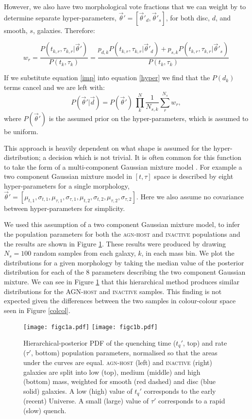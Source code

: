 \documentclass[useAMS,usenatbib]{mn2e}
\begin{document}
{However, we also have two morphological vote fractions that we can weight by to determine separate hyper-parameters, $\vec{\theta}' = [\vec{\theta}'_d, \vec{\theta}'_s]$, for both disc, $d$, and smooth, $s$, galaxies. Therefore:

\begin{equation}\label{morphimp}
w_r = \frac{P(t_{k,r}, \tau_{k,r}|\vec{\theta}')}{P(t_k, \tau_k)} =  \frac{p_{d,k} P(t_{k,r}, \tau_{k,r}|\vec{\theta}'_d) + p_{s,k} P(t_{k,r}, \tau_{k,r}|\vec{\theta}'_s)}{P(t_k, \tau_k)}
\end{equation} 

If we substitute equation \ref{imp} into equation \ref{hyper} we find that the $P(d_k)$ terms cancel and we are left with:
\begin{equation}
P(\vec{\theta}'|\vec{d}) = P(\vec{\theta}')~\prod_k^N \frac{1}{N_{s,k}} \sum_r^{N_s} w_r ,
\end{equation}
where $P(\vec{\theta}')$ is the assumed prior on the hyper-parameters, which is assumed to be uniform.

This approach is heavily dependent on what shape is assumed for the hyper-distribution; a decision which is not trivial. It is often common for this function to take the form of a multi-component Gaussian mixture model \citep{MacKay, Lahav00}. For example a two component Gaussian mixture model in $[t, \tau]$ space is described by eight hyper-parameters for a single morphology, $\vec{\theta}' = [\mu_{t,1}, \sigma_{t,1}, \mu_{\tau,1}, \sigma_{\tau,1}, \mu_{t,2}, \sigma_{t,2}, \mu_{\tau,2}, \sigma_{\tau,2}]$. Here we also assume no covariance between hyper-parameters for simplicity. 

We used this assumption of a two component Gaussian mixture model, to infer the population parameters for both the \textsc{agn-host} and \textsc{inactive} populations and the results are shown in Figure \ref{method3}. These results were produced by drawing $N_s = 100$ random samples from each galaxy, $k$, in each mass bin. We plot the distributions for a given morphology by taking the median value of the posterior distribution for each of the 8 parameters describing the two component Gaussian mixture. We can see in Figure \ref{method3} that this hierarchical method produces similar distributions for the \textsc{AGN-host} and \textsc{inactive} samples. This finding is not expected given the differences between the two samples in colour-colour space seen in Figure \ref{colcol}. 

\begin{figure}
\texttt{[image: figc1a.pdf]}
\texttt{[image: figc1b.pdf]}
\caption[8pt]{Hierarchical-posterior PDF of the quenching time ($t_q'$, top) and rate ($\tau'$, bottom) population parameters, normalised so that the areas under the curves are equal. \textsc{agn-host} (left) and \textsc{inactive} (right) galaxies are split into low (top), medium (middle) and high (bottom) mass, weighted for smooth (red dashed) and disc (blue solid) galaxies. A low (high) value of $t_q'$ corresponds to the early (recent) Universe. A small (large) value of $\tau'$ corresponds to a rapid (slow) quench.}
\label{method3}
\end{figure}

}
\end{document}
